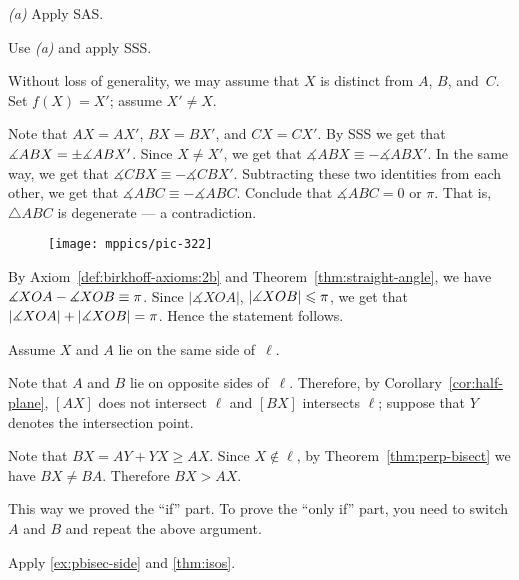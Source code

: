  \textit{(a)} Apply SAS.

 Use \textit{(a)} and apply SSS.

Without loss of generality, we may assume that $X$ is distinct from $A$, $B$, and~$C$.
Set $f(X)=X'$; assume $X'\ne X$.

Note that $AX=AX'$, $BX=BX'$, and $CX=CX'$.
By SSS we get that $\measuredangle ABX\z=\pm\measuredangle ABX'$.
Since $X\ne X'$, we get that
$\measuredangle ABX\equiv - \measuredangle ABX'$.
In the same way, we get that 
$\measuredangle CBX\equiv - \measuredangle CBX'$.
Subtracting these two identities from each other, we get that
$\measuredangle ABC\equiv -\measuredangle ABC$.
Conclude that $\measuredangle ABC=0$ or $\pi$.
That is, $\triangle ABC$ is degenerate --- a contradiction. 

\setcounter{eqtn}{0}

{

\begin{wrapfigure}{r}{29mm}
\vskip -7mm
\centering
\texttt{[image: mppics/pic-322]}
\end{wrapfigure}

By Axiom~\ref{def:birkhoff-axioms:2b} and Theorem~\ref{thm:straight-angle}, we have
$\measuredangle XOA-\measuredangle XOB\z\equiv\pi$.
Since $|\measuredangle XOA|$, $|\measuredangle XOB|\z\le \pi$, we get that
$|\measuredangle XOA|\z+|\measuredangle XOB|\z=\pi$.
Hence the statement follows. 


Assume $X$ and $A$ lie on the same side of~$\ell$.

Note that $A$ and $B$ lie on opposite sides of~$\ell$.
Therefore, by Corollary~\ref{cor:half-plane}, 
$[AX]$ does not intersect $\ell$ 
and $[BX]$ intersects $\ell$;
suppose that $Y$ denotes the intersection point.

}

Note that $BX=AY+YX\ge AX$.
Since $X\notin\ell$, by Theorem~\ref{thm:perp-bisect} we have $BX\ne BA$.
Therefore $BX> AX$.

This way we proved the ``if'' part.
To prove the ``only if'' part, you need to switch $A$ and $B$ and
repeat the above argument.

Apply \ref{ex:pbisec-side} and \ref{thm:isos}.

